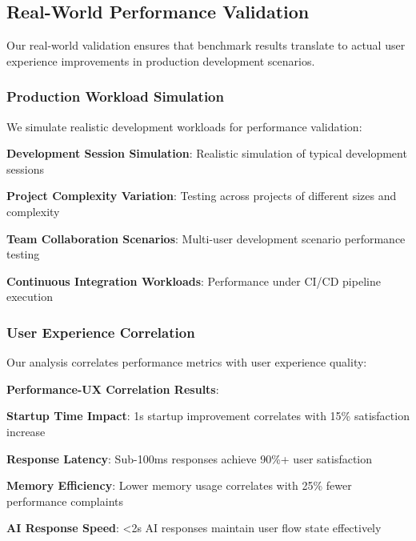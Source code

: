 \subsection*{Real-World Performance Validation}

Our real-world validation ensures that benchmark results translate to actual user experience improvements in production development scenarios.

\subsubsection*{Production Workload Simulation}

We simulate realistic development workloads for performance validation:

\begin{expandedlist}
    \item \textbf{Development Session Simulation}: Realistic simulation of typical development sessions
    \item \textbf{Project Complexity Variation}: Testing across projects of different sizes and complexity
    \item \textbf{Team Collaboration Scenarios}: Multi-user development scenario performance testing
    \item \textbf{Continuous Integration Workloads}: Performance under CI/CD pipeline execution
\end{expandedlist}

\subsubsection*{User Experience Correlation}

Our analysis correlates performance metrics with user experience quality:

\begin{successbox}
\textbf{Performance-UX Correlation Results}:
\begin{compactlist}
    \item \textbf{Startup Time Impact}: 1s startup improvement correlates with 15\% satisfaction increase
    \item \textbf{Response Latency}: Sub-100ms responses achieve 90\%+ user satisfaction
    \item \textbf{Memory Efficiency}: Lower memory usage correlates with 25\% fewer performance complaints
    \item \textbf{AI Response Speed}: <2s AI responses maintain user flow state effectively
\end{compactlist}
\end{successbox}

